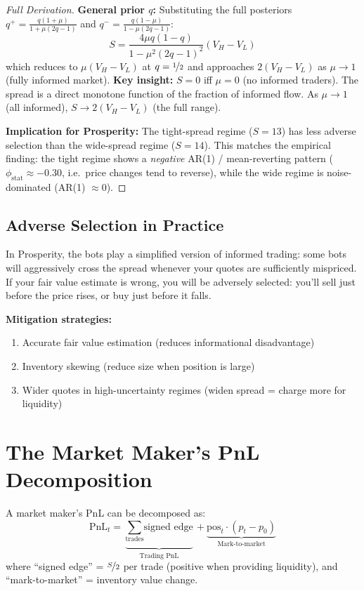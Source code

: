 \documentclass[12pt,a4paper,openany]{report}
\theoremstyle{definition}
\begin{document}
\begin{proof}[Full Derivation]
\textbf{General prior $q$:} Substituting the full posteriors $q^+ = \frac{q(1+\mu)}{1+\mu(2q-1)}$ and $q^- = \frac{q(1-\mu)}{1-\mu(2q-1)}$:
\[
  S = \frac{4\mu q(1-q)}{1 - \mu^2(2q-1)^2}(V_H - V_L)
\]
which reduces to $\mu(V_H - V_L)$ at $q=\nicefrac{1}{2}$ and approaches $2(V_H-V_L)$ as $\mu \to 1$ (fully informed market).
\textbf{Key insight:} $S = 0$ iff $\mu = 0$ (no informed traders). The spread is a direct monotone function of the fraction of informed flow. As $\mu \to 1$ (all informed), $S \to 2(V_H - V_L)$ (the full range).

\textbf{Implication for Prosperity:} The tight-spread regime ($S=13$) has less adverse selection than the wide-spread regime ($S=14$). This matches the empirical finding: the tight regime shows a \emph{negative} AR(1) / mean-reverting pattern ($\phi_{\text{stat}} \approx -0.30$, i.e.\ price changes tend to reverse), while the wide regime is noise-dominated (AR(1) $\approx 0$).
\end{proof}

\subsection{Adverse Selection in Practice}

In Prosperity, the bots play a simplified version of informed trading: some bots will aggressively cross the spread whenever your quotes are sufficiently mispriced. If your fair value estimate is wrong, you will be adversely selected: you'll sell just before the price rises, or buy just before it falls.

\textbf{Mitigation strategies:}
\begin{enumerate}[label=\arabic*.]
  \item Accurate fair value estimation (reduces informational disadvantage)
  \item Inventory skewing (reduce size when position is large)
  \item Wider quotes in high-uncertainty regimes (widen spread = charge more for liquidity)
\end{enumerate}

\section{The Market Maker's PnL Decomposition}

A market maker's PnL can be decomposed as:
\begin{equation}
  \text{PnL}_t = \underbrace{\sum_{\text{trades}} \text{signed edge}}_{\text{Trading PnL}} + \underbrace{\text{pos}_t \cdot (p_t - p_0)}_{\text{Mark-to-market}}
\end{equation}
where ``signed edge'' = $\nicefrac{S}{2}$ per trade (positive when providing liquidity), and ``mark-to-market'' = inventory value change.
\end{document}

